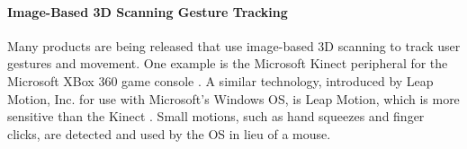 \documentclass[runningheads,a4paper]{llncs}
\begin{document}




\vspace{-0.1in}
\paragraph{\bf Image-Based 3D Scanning Gesture Tracking}

Many products are being released that use image-based 3D scanning to track 
user
gestures and movement.
One example is the Microsoft Kinect peripheral for the Microsoft XBox 360
game console
\cite{Kinect}.
A similar technology, introduced by Leap Motion, Inc. for use with Microsoft's 
Windows OS, is Leap Motion,
which is more sensitive
than the Kinect \cite{LeapMotion}.
Small motions, such as hand squeezes and finger clicks, are detected and used 
by the OS in lieu of a mouse.
\end{document}
